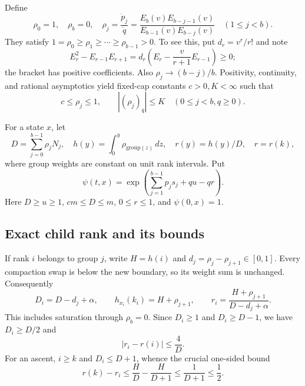 \documentclass[11pt,letterpaper]{article}
\theoremstyle{remark}\newtheorem{remark}[theorem]{Remark}
\begin{document}
Define
\[
 \rho_0=1,\quad\rho_b=0,\quad
 \rho_j=\frac{\dot p_j}{\dot q}
 =\frac{E_b(v)E_{b-j-1}(v)}{E_{b-1}(v)E_{b-j}(v)}\quad(1\le j<b).
\]
They satisfy $1=\rho_0\ge\rho_1\ge\cdots\ge\rho_{b-1}>0$. To see this, put $d_r=v^r/r!$ and note
\[
 E_r^2-E_{r-1}E_{r+1}
 =d_r\left(E_r-\frac{v}{r+1}E_{r-1}\right)\ge0;
\]
the bracket has positive coefficients. Also $\rho_j\to(b-j)/b$. Positivity, continuity, and rational asymptotics yield fixed-cap constants $c>0,K<\infty$ such that
\begin{equation}\label{amc:eq:weights}
 c\le\rho_j\le1,\qquad |(\rho_j)_q|\le K\quad(0\le j<b, q\ge0).
\end{equation}

For a state $x$, let
\[
 D=\sum_{j=0}^{b-1}\rho_jN_j,\quad
 h(y)=\int_0^y\rho_{\mathrm{group}(z)}\,dz,\quad
 r(y)=h(y)/D,\quad r=r(k),
\]
where group weights are constant on unit rank intervals. Put
\begin{equation}\label{amc:eq:psi}
 \psi(t,x)=\exp\left(\sum_{j=1}^{b-1}p_js_j+qu-qr\right).
\end{equation}
Here $D\ge u\ge1$, $cm\le D\le m$, $0\le r\le1$, and $\psi(0,x)=1$.

\subsection{Exact child rank and its bounds}
If rank $i$ belongs to group $j$, write $H=h(i)$ and $d_j=\rho_j-\rho_{j+1}\in[0,1]$. Every compaction swap is below the new boundary, so its weight sum is unchanged. Consequently
\begin{equation}\label{amc:eq:rank}
 D_i=D-d_j+\alpha,\qquad
 h_{x_i}(k_i)=H+\rho_{j+1},\qquad
 r_i=\frac{H+\rho_{j+1}}{D-d_j+\alpha}.
\end{equation}
This includes saturation through $\rho_b=0$. Since $D_i\ge1$ and $D_i\ge D-1$, we have $D_i\ge D/2$ and
\begin{equation}\label{amc:eq:rankbound}
 |r_i-r(i)|\le\frac4D.
\end{equation}
For an ascent, $i\ge k$ and $D_i\le D+1$, whence the crucial one-sided bound
\begin{equation}\label{amc:eq:ascentbound}
 r(k)-r_i\le\frac HD-\frac H{D+1}\le\frac1{D+1}\le\frac12.
\end{equation}
\end{document}
